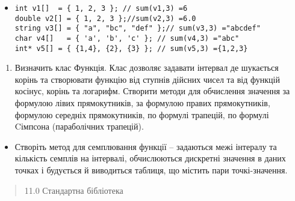 \documentclass[]{article}
\begin{document}
\begin{itemize}
\item
\begin{verbatim}
int v1[]  = { 1, 2, 3 }; // sum(v1,3) =6 
double v2[] = { 1, 2, 3 };//sum(v2,3) =6.0 
string v3[] = { "a", "bc", "def" };// sum(v3,3) ="abcdef"
char v4[]   = { 'a', 'b', 'c' }; // sum(v4,3) ="abc"
int* v5[] = { {1,4}, {2}, {3} }; // sum(v5,3) ={1,2,3}
\end{verbatim}
\end{itemize}

\begin{enumerate}
\def\labelenumi{\arabic{enumi}.}
\item
  Визначить клас Функція. Клас дозволяє задавати інтервал де шукається
  корінь та створювати функцію від ступнів дійсних чисел та від функцій
  косінус, корінь та логарифм. Створити методи для обчислення значення
  за формулою лівих прямокутників, за формулою правих прямокутників,
  формулою середніх прямокутників, по формулі трапецій, по формулі
  Cімпсона (параболічних трапецій).
\end{enumerate}

\begin{itemize}
\item
  Створіть метод для семплювання функції -- задаються межі інтералу та
  кількість семплів на інтервалі, обчислюються дискретні значення в
  даних точках і будується й виводиться таблиця, що містить пари
  точкі-значення.
\end{itemize}

\begin{quote}
11.0 Стандартна бібліотека
\end{quote}
\end{document}
